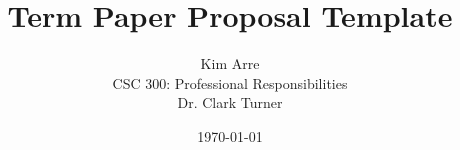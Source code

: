 \documentclass[12pt]{article}
\begin{document}

\title{\vfill Term Paper Proposal Template} %
\author{
  Kim Arre \vspace{10pt} \\
  CSC 300: Professional Responsibilities  \vspace{10pt} \\
  Dr. Clark Turner \vspace{10pt} \\
}
\date{\today}

\maketitle

\vfill  %
\begin{abstract}
\lipsum[1]
\end{abstract}

\thispagestyle{empty} %
\newpage
\end{document}
